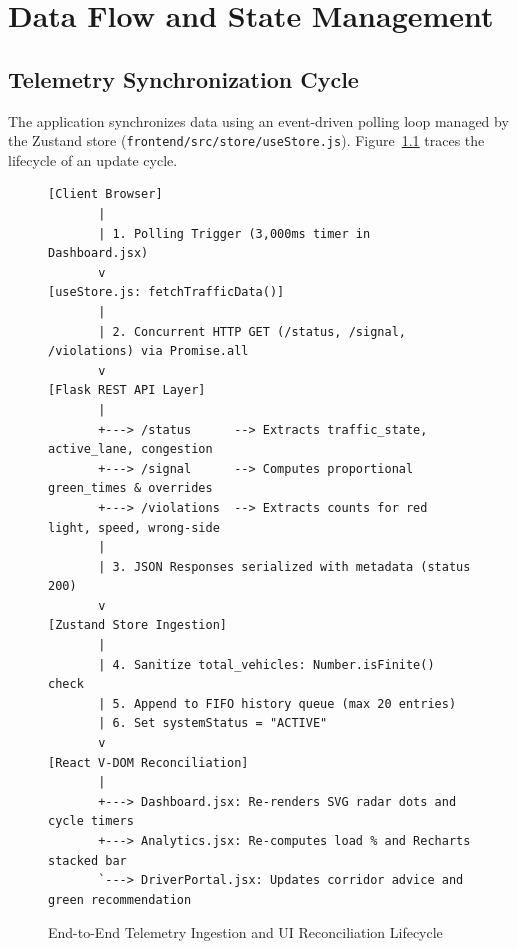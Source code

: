 \chapter{Data Flow and State Management}

\section{Telemetry Synchronization Cycle}
The application synchronizes data using an event-driven polling loop managed by the Zustand store (\texttt{frontend/src/store/useStore.js}). Figure~\ref{fig:data_flow_diag} traces the lifecycle of an update cycle.

\begin{figure}[h!]
\centering
\small
\begin{tcolorbox}[colback=white,colframe=branddark,arc=2mm,title=\textbf{End-to-End State Synchronization Flow}]
\begin{verbatim}
[Client Browser]
       |
       | 1. Polling Trigger (3,000ms timer in Dashboard.jsx)
       v
[useStore.js: fetchTrafficData()]
       |
       | 2. Concurrent HTTP GET (/status, /signal, /violations) via Promise.all
       v
[Flask REST API Layer]
       |
       +---> /status      --> Extracts traffic_state, active_lane, congestion
       +---> /signal      --> Computes proportional green_times & overrides
       +---> /violations  --> Extracts counts for red light, speed, wrong-side
       |
       | 3. JSON Responses serialized with metadata (status 200)
       v
[Zustand Store Ingestion]
       |
       | 4. Sanitize total_vehicles: Number.isFinite() check
       | 5. Append to FIFO history queue (max 20 entries)
       | 6. Set systemStatus = "ACTIVE"
       v
[React V-DOM Reconciliation]
       |
       +---> Dashboard.jsx: Re-renders SVG radar dots and cycle timers
       +---> Analytics.jsx: Re-computes load % and Recharts stacked bar
       `---> DriverPortal.jsx: Updates corridor advice and green recommendation
\end{verbatim}
\end{tcolorbox}
\caption{End-to-End Telemetry Ingestion and UI Reconciliation Lifecycle}
\label{fig:data_flow_diag}
\end{figure}

